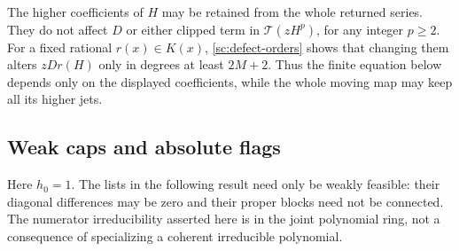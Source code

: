 \documentclass[11pt,a4paper]{amsart}
\numberwithin{equation}{section}
\theoremstyle{plain}
\theoremstyle{definition}
\begin{document}
The higher coefficients of \(H\) may be retained from the whole
returned series.  They do not affect \(D\) or either clipped term in
\(\mathcal T(zH^p)\), for any integer \(p\ge2\).
For a fixed rational \(r(x)\in K(x)\), \eqref{sc:defect-orders}
shows that changing them alters \(zD r(H)\) only in degrees at least \(2M+2\).
Thus the finite equation below depends only on the displayed
coefficients, while the whole moving map may keep all its higher jets.

\subsection{Weak caps and absolute flags}

Here \(h_0=1\).  The lists in the following result need only be weakly
feasible: their diagonal differences may be zero and their proper
blocks need not be connected.  The numerator irreducibility asserted
here is in the joint polynomial ring, not a consequence of specializing
a coherent irreducible polynomial.
\end{document}
